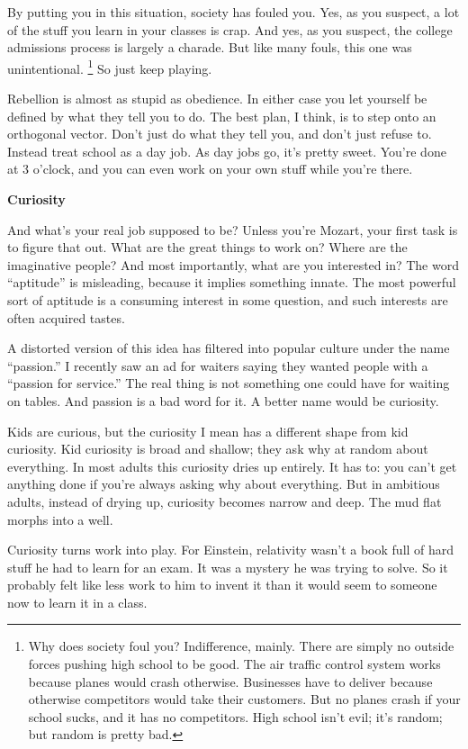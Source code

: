 \documentclass[12pt]{book}
\begin{document}
By putting you in this situation, society has fouled you. Yes, as you
suspect, a lot of the stuff you learn in your classes is crap. And yes,
as you suspect, the college admissions process is largely a charade. But
like many fouls, this one was unintentional. \footnote{Why does society foul you? Indifference, mainly. There are
simply no outside forces pushing high school to be good. The air traffic
control system works because planes would crash otherwise. Businesses
have to deliver because otherwise competitors would take their
customers. But no planes crash if your school sucks, and it has no
competitors. High school isn't evil; it's random; but random is pretty
bad.} So just keep
playing.

Rebellion is almost as stupid as obedience. In either case you let
yourself be defined by what they tell you to do. The best plan, I think,
is to step onto an orthogonal vector. Don't just do what they tell you,
and don't just refuse to. Instead treat school as a day job. As day jobs
go, it's pretty sweet. You're done at 3 o'clock, and you can even work
on your own stuff while you're there.

\textbf{Curiosity}

And what's your real job supposed to be? Unless you're Mozart, your
first task is to figure that out. What are the great things to work on?
Where are the imaginative people? And most importantly, what are you
interested in? The word ``aptitude'' is misleading, because it implies
something innate. The most powerful sort of aptitude is a consuming
interest in some question, and such interests are often acquired tastes.

A distorted version of this idea has filtered into popular culture under
the name ``passion.'' I recently saw an ad for waiters saying they
wanted people with a ``passion for service.'' The real thing is not
something one could have for waiting on tables. And passion is a bad
word for it. A better name would be curiosity.

Kids are curious, but the curiosity I mean has a different shape from
kid curiosity. Kid curiosity is broad and shallow; they ask why at
random about everything. In most adults this curiosity dries up
entirely. It has to: you can't get anything done if you're always asking
why about everything. But in ambitious adults, instead of drying up,
curiosity becomes narrow and deep. The mud flat morphs into a well.

Curiosity turns work into play. For Einstein, relativity wasn't a book
full of hard stuff he had to learn for an exam. It was a mystery he was
trying to solve. So it probably felt like less work to him to invent it
than it would seem to someone now to learn it in a class.
\end{document}
